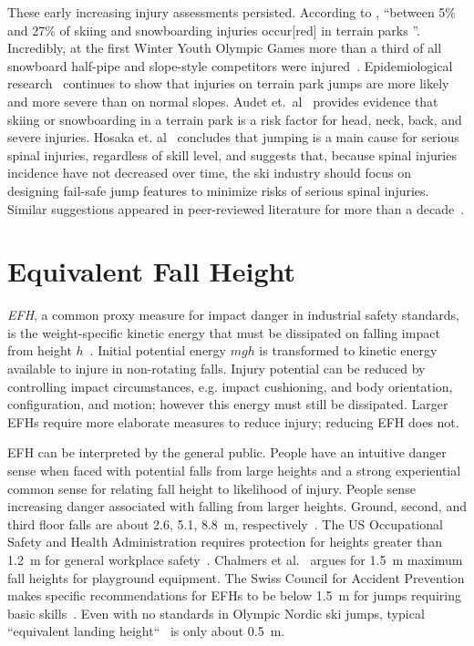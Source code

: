 \documentclass[smallextended]{svjour3}       %
\begin{document}
These early increasing injury assessments persisted. According to
\cite{Russell2014}, ``between 5\% and 27\% of skiing and snowboarding injuries
occur[red] in terrain parks
\cite{Bridges2003,Goulet2007,Moffat2009,Greve2009,Brooks2010,Ruedl2013}''.
Incredibly, at the first Winter Youth Olympic Games more than a third of all
snowboard half-pipe and slope-style competitors were injured~\cite{Ruedl2012}.
Epidemiological research~\cite{Carus2016,Audet2020,Hosaka2020} continues to
show that injuries on terrain park jumps are more likely and more severe than
on normal slopes. Audet et.~al~\cite{Audet2020} provides evidence that skiing
or snowboarding in a terrain park is a risk factor for head, neck, back, and
severe injuries. Hosaka et. al~\cite{Hosaka2020} concludes that jumping is a
main cause for serious spinal injuries, regardless of skill level, and suggests
that, because spinal injuries incidence  have not decreased over time,  the ski
industry should focus on designing fail-safe jump features to minimize risks of
serious spinal injuries. Similar suggestions appeared in peer-reviewed
literature for more than a
decade~\cite{Hubbard2009,Swedberg2012,McNeil2012,McNeil2012a,Hubbard2015,Levy2015,Petrone2017,Moore2018}.

\section{Equivalent Fall Height}
\label{sec:efh}
%
\emph{EFH}, a common proxy measure for impact danger in industrial safety
standards, is the weight-specific kinetic energy that must be dissipated on
falling impact from height $h$~\cite{Muller1995,Hubbard2009,Gasser2018}.
Initial potential energy $mgh$ is transformed to kinetic energy available to
injure in non-rotating falls. Injury potential can be reduced by controlling
impact circumstances, e.g. impact cushioning, and body orientation,
configuration, and motion; however this energy must still be dissipated. Larger
EFHs require more elaborate measures to reduce injury; reducing EFH does not.

EFH can be interpreted by the general public. People have an intuitive danger
sense when faced with potential falls from large heights and a strong
experiential common sense for relating fall height to likelihood of injury.
People sense increasing danger associated with falling from larger heights.
Ground, second, and third floor falls are about 2.6, 5.1, 8.8~\si{\meter},
respectively~\cite{Vish2005}. The US Occupational Safety and Health
Administration requires protection for heights greater than 1.2~\si{\meter} for
general workplace safety~\cite{OSHA2021}.  Chalmers et al.~\cite{Chalmers1996}
argues for 1.5~\si{\meter} maximum fall heights for playground equipment. The
Swiss Council for Accident Prevention makes specific recommendations for EFHs
to be below 1.5~\si{\meter} for jumps requiring basic skills~\cite{Heer2019}.
Even with no standards in Olympic Nordic ski jumps, typical ``equivalent
landing height``~\cite{Gasser2018} is only about 0.5~\si{\meter}.
\end{document}
